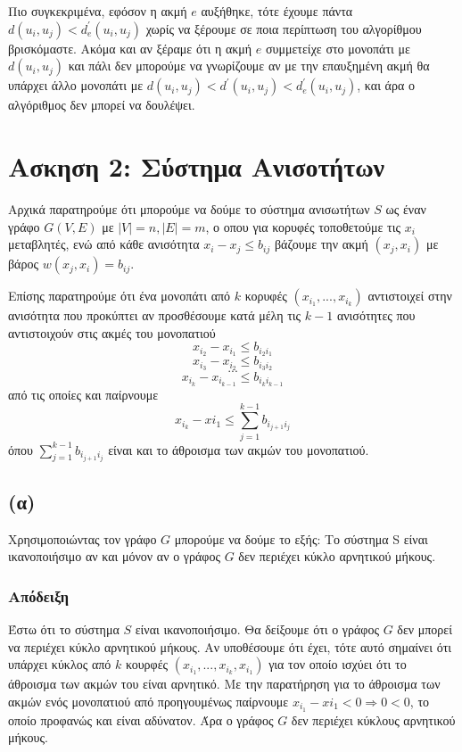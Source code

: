 \documentclass[a4paper,11pt]{article}
\begin{document}
Πιο συγκεκριμένα, εφόσον η ακμή $e$ αυξήθηκε, τότε έχουμε πάντα
$d(u_i,u_j) < d_e^\prime(u_i,u_j)$ χωρίς να ξέρουμε σε ποια περίπτωση του αλγορίθμου βρισκόμαστε. Ακόμα και αν ξέραμε ότι η ακμή $e$ συμμετείχε στο μονοπάτι με $d(u_i,u_j)$ και πάλι δεν μπορούμε να γνωρίζουμε αν με την επαυξημένη ακμή θα υπάρχει άλλο μονοπάτι με $d(u_i,u_j) < d^\prime(u_i,u_j) < d_e^\prime(u_i,u_j)$, και άρα ο αλγόριθμος δεν μπορεί να δουλέψει.

\section*{Ασκηση 2: Σύστημα Ανισοτήτων}

Αρχικά παρατηρούμε ότι μπορούμε να δούμε το σύστημα ανισωτήτων $S$ ως έναν γράφο $G(V,E)$ με $|V| = n, |E| = m$, ο οπου για κορυφές τοποθετούμε τις $x_i$ μεταβλητές, ενώ από κάθε ανισότητα $x_i-x_j\leq b_{ij}$ βάζουμε την ακμή $(x_j, x_i)$ με βάρος $w(x_j, x_i) = b_{ij}$.

Επίσης παρατηρούμε ότι ένα μονοπάτι από $k$ κορυφές $(x_{i_1},...,x_{i_k})$ αντιστοιχεί στην ανισότητα που προκύπτει αν προσθέσουμε κατά μέλη τις $k-1$ ανισότητες που αντιστοιχούν στις ακμές του μονοπατιού
$$x_{i_2}-x_{i_1}\leq b_{i_2i_1}$$
$$x_{i_3}-x_{i_2}\leq b_{i_3i_2}$$
$$...$$
$$x_{i_k}-x_{i_{k-1}}\leq b_{i_ki_{k-1}}$$
από τις οποίες και παίρνουμε
$$x_{i_k}-x{i_1}\leq \sum_{j=1}^{k-1}b_{i_{j+1}i_j}$$
όπου $\sum_{j=1}^{k-1}b_{i_{j+1}i_j}$ είναι και το άθροισμα των ακμών του μονοπατιού.

\subsection*{(α)}
Χρησιμοποιώντας τον γράφο $G$ μπορούμε να δούμε το εξής: Το σύστημα S είναι ικανοποιήσιμο αν και μόνον αν ο γράφος $G$ δεν περιέχει κύκλο αρνητικού μήκους.

\subsubsection*{Απόδειξη}
Έστω ότι το σύστημα $S$ είναι ικανοποιήσιμο. Θα δείξουμε ότι ο γράφος $G$ δεν μπορεί να περιέχει κύκλο αρνητικού μήκους. Αν υποθέσουμε ότι έχει, τότε αυτό σημαίνει ότι υπάρχει κύκλος από $k$ κουρφές $(x_{i_1},...,x_{i_k},x_{i_1})$ για τον οποίο ισχύει ότι το άθροισμα των ακμών του είναι αρνητικό. Με την παρατήρηση για το άθροισμα των ακμών ενός μονοπατιού από προηγουμένως παίρνουμε $x_{i_1}-x{i_1} < 0 \Rightarrow 0 < 0$, το οποίο προφανώς και είναι αδύνατον. Άρα ο γράφος $G$ δεν περιέχει κύκλους αρνητικού μήκους.
\end{document}
